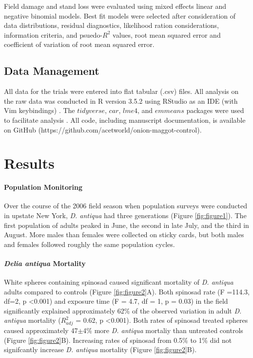 \documentclass[alpha-refs]{wiley-article}
\begin{document}
Field damage and stand loss were evaluated using mixed effects linear and negative binomial models.  Best fit models were selected after consideration of data distributions, residual diagnostics, likelihood ration considerations, information criteria, and psuedo-$R^2$ values, root mean squared error and coefficient of variation of root mean squared error.  


\subsection{Data Management}

All data for the trials were entered into flat tabular (.csv) files.  All analysis on the raw data was conducted in R version 3.5.2 using RStudio as an IDE (with Vim keybindings) \citep{rcore2018,rstudio}.  The $tidyverse$, $car$, $lme4$, and $emmeans$ packages were used to facilitate analysis \citep{tidy, car, lme, emmeans}.  All code, including manuscript documentation, is available on GitHub (https://github.com/acetworld/onion-maggot-control).


\section{Results}

\paragraph{Population Monitoring}

Over the course of the 2006 field season when population surveys were conducted in upstate New York, \textit{D. antiqua} had three generations (Figure \ref{fig:figure1}).  The first population of adults peaked in June, the second in late July, and the third in August.  More males than females were collected on sticky cards, but both males and females followed roughly the same population cycles. 

\paragraph{\textit{Delia antiqua} Mortality}

White spheres containing spinosad caused significant mortality of \textit{D. antiqua} adults compared to controls (Figure \ref{fig:figure2}A).  Both spinosad rate (F =114.3, df=2, p \textless 0.001)  and exposure time (F = 4.7, df = 1, p = 0.03) in the field significantly explained approximately 62\% of the observed variation in adult \textit{D. antiqua} mortality ($R^2_{adj}$ = 0.62, p \textless 0.001).  Both rates of spinosad treated spheres caused approximately 47$\pm$4\% more \textit{D. antiqua} mortaliy than untreated controls (Figure \ref{fig:figure2}B).  Increasing rates of spinosad from 0.5\% to 1\% did not signifcantly increase \textit{D. antiqua} mortality (Figure \ref{fig:figure2}B).  
\end{document}
